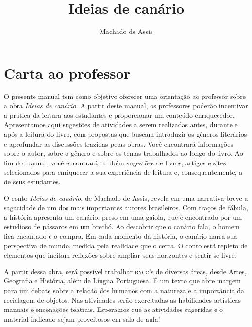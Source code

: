 \documentclass[11pt]{extarticle}
\newcommand{\AutorLivro}{Machado de Assis}
\newcommand{\TituloLivro}{Ideias de canário}
\newcommand{\colaborador}{Ana Lancman}
\begin{document}
\title{\TituloLivro}
\author{\AutorLivro}
\def\authornotes{\colaborador}

\date{}
\maketitle


\tableofcontents

\section{Carta ao professor}

O presente manual tem como objetivo oferecer uma orientação ao professor sobre a obra \textit{Ideias de canário}. A partir deste manual, os professores poderão incentivar a prática da leitura aos estudantes e proporcionar um conteúdo enriquecedor. Apresentamos aqui sugestões de atividades a serem realizadas antes, durante e após a leitura do livro, com propostas que buscam introduzir os gêneros literários e aprofundar as discussões trazidas pelas obras. Você encontrará informações sobre o autor, sobre o gênero e sobre os temas trabalhados ao longo do livro. Ao fim do manual, você encontrará também sugestões de livros, artigos e sites selecionados para enriquecer a sua experiência de leitura e, consequentemente, a de seus estudantes.

O conto \textit{Ideias de canário}, de Machado de Assis, revela em uma narrativa breve a sagacidade de um dos mais importantes autores brasileiros. Com traços de fábula, a história apresenta um canário, preso em uma gaiola, que é encontrado por um estudioso de pássaros em um brechó. Ao descobrir que o canário fala, o homem fica encantado e o compra. Em cada momento da história, o canário narra sua perspectiva de mundo, medida pela realidade que o cerca. O conto está repleto de elementos que incitam reflexões sobre ampliar seus horizontes e sentir-se livre.

A partir dessa obra, será possível trabalhar \textsc{bncc}'s de diversas áreas, desde Artes, Geografia e História, além de Língua Portuguesa. É um texto que abre margem para um debate sobre a relação dos humanos com a natureza e a importância da reciclagem de objetos. Nas atividades serão exercitadas as habilidades artísticas manuais e encenações teatrais. Esperamos que as atividades sugeridas e o material indicado sejam proveitosos em sala de aula! 
\end{document}
